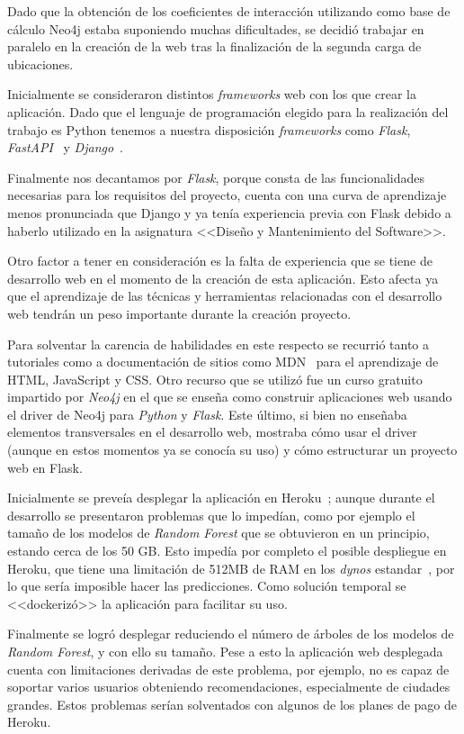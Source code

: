 Dado que la obtención de los coeficientes de interacción utilizando como base de cálculo Neo4j estaba suponiendo muchas dificultades, se decidió trabajar en paralelo en la creación de la web tras la finalización de la segunda carga de ubicaciones.

Inicialmente se consideraron distintos \textit{frameworks} web con los que crear la aplicación. Dado que el lenguaje de programación elegido para la realización del trabajo es Python tenemos a nuestra disposición \textit{frameworks} como \textit{Flask}, \textit{FastAPI}~\cite{FastAPI} y \textit{Django}~\cite{Django}.

Finalmente nos decantamos por \textit{Flask}, porque consta de las funcionalidades necesarias para los requisitos del proyecto, cuenta con una curva de aprendizaje menos pronunciada que Django y ya tenía experiencia previa con Flask debido a haberlo utilizado en la asignatura <<Diseño y Mantenimiento del Software>>.

Otro factor a tener en consideración es la falta de experiencia que se tiene de desarrollo web en el momento de la creación de esta aplicación. Esto afecta ya que el aprendizaje de las técnicas y herramientas relacionadas con el desarrollo web tendrán un peso importante durante la creación proyecto.

Para solventar la carencia de habilidades en este respecto se recurrió tanto a tutoriales como a documentación de sitios como MDN~\cite{mozillaDocs} para el aprendizaje de HTML, JavaScript y CSS. Otro recurso que se utilizó fue un curso gratuito impartido por \textit{Neo4j} en el que se enseña como construir aplicaciones web usando el driver de Neo4j para \textit{Python} y \textit{Flask}. Este último, si bien no enseñaba elementos transversales en el desarrollo web, mostraba cómo usar el driver (aunque en estos momentos ya se conocía su uso) y cómo estructurar un proyecto web en Flask.

Inicialmente se preveía desplegar la aplicación en Heroku~\cite{herokuWhatHeroku}; aunque durante el desarrollo se presentaron problemas que lo impedían, como por ejemplo el tamaño de los modelos de \textit{Random Forest} que se obtuvieron en un principio, estando cerca de los 50 GB. Esto impedía por completo el posible despliegue en Heroku, que tiene una limitación de 512MB de RAM en los \textit{dynos} estandar~\cite{herokuHerokuDynos}, por lo que sería imposible hacer las predicciones. Como solución temporal se <<dockerizó>> la aplicación para facilitar su uso.

Finalmente se logró desplegar reduciendo el número de árboles de los modelos de \textit{Random Forest}, y con ello su tamaño. Pese a esto la aplicación web desplegada cuenta con limitaciones derivadas de este problema, por ejemplo, no es capaz de soportar varios usuarios obteniendo recomendaciones, especialmente de ciudades grandes. Estos problemas serían solventados con algunos de los planes de pago de Heroku.


